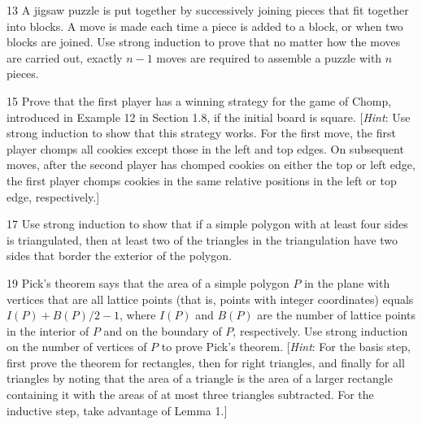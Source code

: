 \documentclass[11pt]{article}
\begin{document}
\begin{exercise}{13}
    A jigsaw puzzle is put together by successively joining pieces
    that fit together into blocks. A move is made each time a piece
    is added to a block, or when two blocks are joined. Use strong
    induction to prove that no matter how the moves are carried out,
    exactly $n - 1$ moves are required to assemble a puzzle with $n$
    pieces.
\end{exercise}

\begin{exercise}{15}
    Prove that the first player has a winning strategy for the game of
    Chomp, introduced in Example 12 in Section 1.8, if the initial
    board is square.
    [\emph{Hint}: Use strong induction to show that this strategy
    works. For the first move, the first player chomps all cookies
    except those in the left and top edges. On subsequent moves, after
    the second player has chomped cookies on either the top or left
    edge, the first player chomps cookies in the same relative
    positions in the left or top edge, respectively.]
\end{exercise}

\begin{exercise}{17}
    Use strong induction to show that if a simple polygon with at
    least four sides is triangulated, then at least two of the
    triangles in the triangulation have two sides that border the
    exterior of the polygon.
\end{exercise}

\begin{exercise}{19}
    Pick's theorem says that the area of a simple polygon $P$ in the
    plane with vertices that are all lattice points (that is, points
    with integer coordinates) equals $I(P) + B(P)/2 - 1$, where $I(P)$
    and $B(P)$ are the number of lattice points in the interior of $P$
    and on the boundary of $P$, respectively. Use strong induction on
    the number of vertices of $P$ to prove Pick's theorem.
    [\emph{Hint}: For the basis step, first prove the theorem for
    rectangles, then for right triangles, and finally for all
    triangles by noting that the area of a triangle is the area of a
    larger rectangle containing it with the areas of at most three
    triangles subtracted. For the inductive step, take advantage of
    Lemma 1.]
\end{exercise}
\end{document}
